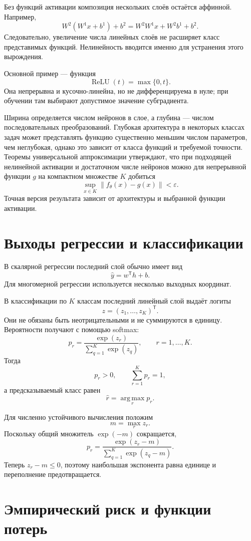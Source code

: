 Без функций активации композиция нескольких слоёв остаётся аффинной.
Например,
\[
    W^2(W^1x+b^1)+b^2
    =
    W^2W^1x+W^2b^1+b^2.
\]
Следовательно, увеличение числа линейных слоёв не расширяет класс
представимых функций. Нелинейность вводится именно для устранения
этого вырождения.

Основной пример — функция
\[
    \operatorname{ReLU}(t)=\max\{0,t\}.
\]
Она непрерывна и кусочно-линейна, но не дифференцируема в нуле; при
обучении там выбирают допустимое значение субградиента.

Ширина определяется числом нейронов в слое, а глубина — числом
последовательных преобразований. Глубокая архитектура в некоторых
классах задач может представлять функцию существенно меньшим числом
параметров, чем неглубокая, однако это зависит от класса функций и
требуемой точности. Теоремы универсальной аппроксимации утверждают,
что при подходящей нелинейной активации и достаточном числе нейронов
можно для непрерывной функции \(g\) на компактном множестве \(K\)
добиться
\[
    \sup_{x\in K}
    \lVert f_\theta(x)-g(x)\rVert
    <\varepsilon.
\]
Точная версия результата зависит от архитектуры и выбранной функции
активации.

\section{Выходы регрессии и классификации}

В скалярной регрессии последний слой обычно имеет вид
\[
    \widehat y=w^{\mathsf T}h+b.
\]
Для многомерной регрессии используется несколько выходных координат.

В классификации по \(K\) классам последний линейный слой выдаёт
логиты
\[
    z=(z_1,\ldots,z_K)^{\mathsf T}.
\]
Они не обязаны быть неотрицательными и не суммируются в единицу.
Вероятности получают с помощью softmax:
\[
    p_r
    =
    \frac{\exp(z_r)}
    {\displaystyle\sum_{q=1}^{K}\exp(z_q)},
    \qquad
    r=1,\ldots,K.
\]
Тогда
\[
    p_r>0,
    \qquad
    \sum_{r=1}^{K}p_r=1,
\]
а предсказываемый класс равен
\[
    \widehat r
    =
    \operatorname*{arg\,max}_{r}p_r.
\]

Для численно устойчивого вычисления положим
\[
    m=\max_r z_r.
\]
Поскольку общий множитель \(\exp(-m)\) сокращается,
\[
    p_r
    =
    \frac{\exp(z_r-m)}
    {\displaystyle\sum_{q=1}^{K}\exp(z_q-m)}.
\]
Теперь \(z_r-m\le0\), поэтому наибольшая экспонента равна единице и
переполнение предотвращается.

\section{Эмпирический риск и функции потерь}

